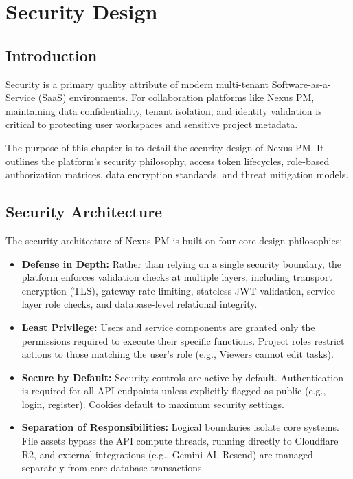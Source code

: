 \chapter{Security Design}
\label{chap:security-design}

\section{Introduction}
Security is a primary quality attribute of modern multi-tenant Software-as-a-Service (SaaS) environments. For collaboration platforms like Nexus PM, maintaining data confidentiality, tenant isolation, and identity validation is critical to protecting user workspaces and sensitive project metadata.

The purpose of this chapter is to detail the security design of Nexus PM. It outlines the platform's security philosophy, access token lifecycles, role-based authorization matrices, data encryption standards, and threat mitigation models.

\section{Security Architecture}
The security architecture of Nexus PM is built on four core design philosophies:
\begin{itemize}
    \item \textbf{Defense in Depth:} Rather than relying on a single security boundary, the platform enforces validation checks at multiple layers, including transport encryption (TLS), gateway rate limiting, stateless JWT validation, service-layer role checks, and database-level relational integrity.
    \item \textbf{Least Privilege:} Users and service components are granted only the permissions required to execute their specific functions. Project roles restrict actions to those matching the user's role (e.g., Viewers cannot edit tasks).
    \item \textbf{Secure by Default:} Security controls are active by default. Authentication is required for all API endpoints unless explicitly flagged as public (e.g., login, register). Cookies default to maximum security settings.
    \item \textbf{Separation of Responsibilities:} Logical boundaries isolate core systems. File assets bypass the API compute threads, running directly to Cloudflare R2, and external integrations (e.g., Gemini AI, Resend) are managed separately from core database transactions.
\end{itemize}

